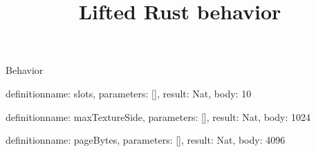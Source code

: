 \begin{lexlean}{Behavior}
\title{Lifted Rust behavior}
\begin{semanticmodule}
definition{name: slots, parameters: [], result: Nat, body: 10}

definition{name: maxTextureSide, parameters: [], result: Nat, body: 1024}

definition{name: pageBytes, parameters: [], result: Nat, body: 4096}
\end{semanticmodule}
\end{lexlean}

